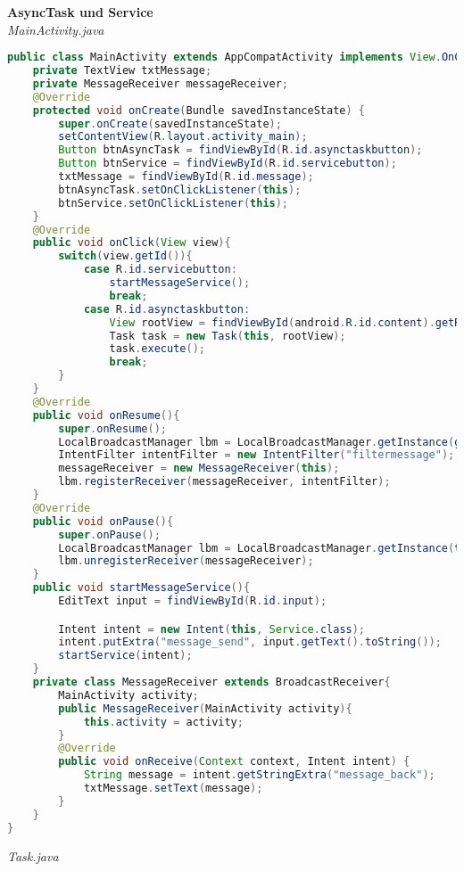 \textbf{AsyncTask und Service} \\
\textit{MainActivity.java}
\begin{lstlisting}[language=java]
public class MainActivity extends AppCompatActivity implements View.OnClickListener {
    private TextView txtMessage;
    private MessageReceiver messageReceiver;
    @Override
    protected void onCreate(Bundle savedInstanceState) {
        super.onCreate(savedInstanceState);
        setContentView(R.layout.activity_main);
        Button btnAsyncTask = findViewById(R.id.asynctaskbutton);
        Button btnService = findViewById(R.id.servicebutton);
        txtMessage = findViewById(R.id.message);
        btnAsyncTask.setOnClickListener(this);
        btnService.setOnClickListener(this);
    }
    @Override
    public void onClick(View view){
        switch(view.getId()){
            case R.id.servicebutton:
                startMessageService();
                break;
            case R.id.asynctaskbutton:
                View rootView = findViewById(android.R.id.content).getRootView();
                Task task = new Task(this, rootView);
                task.execute();
                break;
        }
    }
    @Override
    public void onResume(){
        super.onResume();
        LocalBroadcastManager lbm = LocalBroadcastManager.getInstance(getApplicationContext());
        IntentFilter intentFilter = new IntentFilter("filtermessage");
        messageReceiver = new MessageReceiver(this);
        lbm.registerReceiver(messageReceiver, intentFilter);
    }
    @Override
    public void onPause(){
        super.onPause();
        LocalBroadcastManager lbm = LocalBroadcastManager.getInstance(this);
        lbm.unregisterReceiver(messageReceiver);
    }
    public void startMessageService(){
        EditText input = findViewById(R.id.input);

        Intent intent = new Intent(this, Service.class);
        intent.putExtra("message_send", input.getText().toString());
        startService(intent);
    }
    private class MessageReceiver extends BroadcastReceiver{
        MainActivity activity;
        public MessageReceiver(MainActivity activity){
            this.activity = activity;
        }
        @Override
        public void onReceive(Context context, Intent intent) {
            String message = intent.getStringExtra("message_back");
            txtMessage.setText(message);
        }
    }
}
\end{lstlisting}
\textit{Task.java}
